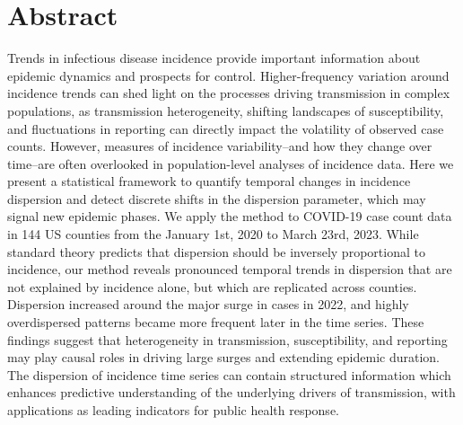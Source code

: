 \documentclass[10pt,letterpaper]{article}
\begin{document}
\section*{Abstract}
Trends in infectious disease incidence provide important information about epidemic dynamics and prospects for control. 
Higher-frequency variation around incidence trends can shed light on the processes driving transmission in complex populations, as transmission heterogeneity, shifting landscapes of susceptibility, and fluctuations in reporting can directly impact the volatility of observed case counts.
However, measures of incidence variability--and how they change over time--are often overlooked in population-level analyses of incidence data.
Here we present a statistical framework to quantify temporal changes in incidence dispersion and detect discrete shifts in the dispersion parameter, which may signal new epidemic phases. 
We apply the method to COVID-19 case count data in 144 US counties from the January 1st, 2020 to March 23rd, 2023.
While standard theory predicts that dispersion should be inversely proportional to incidence, our method reveals pronounced temporal trends in dispersion that are not explained by incidence alone, but which are replicated across counties. 
Dispersion increased around the major surge in cases in 2022, and highly overdispersed patterns became more frequent later in the time series.
These findings suggest that heterogeneity in transmission, susceptibility, and reporting may play causal roles in driving large surges and extending epidemic duration. 
The dispersion of incidence time series can contain structured information which enhances predictive understanding of the underlying drivers of transmission, with applications as leading indicators for public health response.



\end{document}
